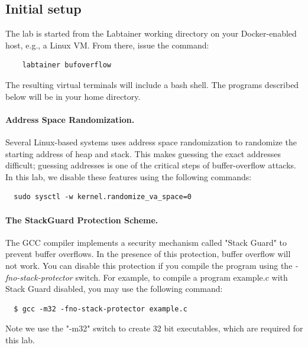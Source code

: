\subsection{Initial setup}
The lab is started from the Labtainer working 
directory on your Docker-enabled host, e.g., a Linux VM.
From there, issue the command:
\begin{verbatim}
    labtainer bufoverflow
\end{verbatim}

The resulting virtual terminals will include a 
bash shell.  The programs
described below will be in your home directory.

\paragraph{Address Space Randomization.}
Several Linux-based systems uses address space
randomization to randomize the starting address of heap and
stack. This makes guessing the exact addresses difficult; guessing
addresses is one of the critical steps of buffer-overflow attacks.  In
this lab, we disable these features using the following commands:

\begin{verbatim}
  sudo sysctl -w kernel.randomize_va_space=0
\end{verbatim}


\paragraph{The StackGuard Protection Scheme.}
The GCC compiler implements a security mechanism called
"Stack Guard" to prevent buffer overflows. In the presence of this
protection, buffer overflow will not work. You can disable this
protection if you compile the program using the 
\emph{-fno-stack-protector} switch. For example, to compile a program
example.c with Stack Guard disabled, you may use the following command:
\begin{verbatim}
  $ gcc -m32 -fno-stack-protector example.c
\end{verbatim}
\noindent Note we use the "-m32" switch to create 32 bit executables, which
are required for this lab.

